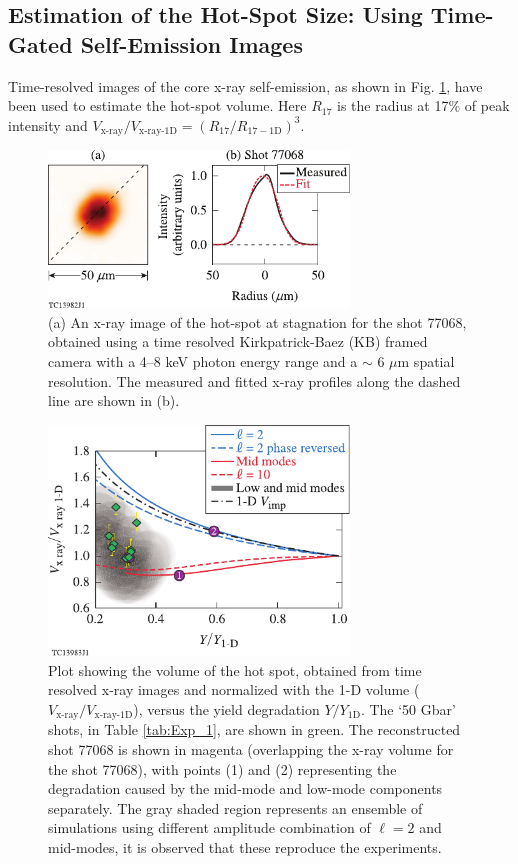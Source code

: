\documentclass[aip,reprint]{revtex4-1}
\begin{document}
\subsection{Estimation of the Hot-Spot Size: Using Time-Gated Self-Emission Images}
\label{sec:Exp_gatedimage}
%
%
 Time-resolved images of the core x-ray self-emission, as shown in Fig. \ref{fig:Exp_kbframed}, have been used to estimate the hot-spot volume. Here $R_{17}$ is the radius at 17$\%$ of peak intensity and $V_\text{x-ray}/V_\text{x-ray-1D} = (R_{17}/R_{17-\text{1D}})^3$.
%
%
\begin{figure}
\includegraphics[width=80mm]{Fig7_Bose}
\caption{\label{fig:Exp_kbframed} (a) An x-ray image of the hot-spot at stagnation for the shot 77068, obtained using a time resolved Kirkpatrick-Baez (KB) framed camera with a 4--8 keV photon energy range and a $\sim$ 6 $\mu$m spatial resolution.\cite{Exp_Fred} The measured and fitted x-ray profiles along the dashed line are shown in (b).}
\end{figure}
%
%
%
%
%
%
%
\begin{figure}
\includegraphics[width=80mm]{Fig8_Bose}
\caption{\label{fig:Exp_volume} Plot showing the volume of the hot spot, obtained from time resolved x-ray images and normalized with the 1-D volume ($V_\text{x-ray}/V_\text{x-ray-1D}$), versus the yield degradation $Y/Y_\text{1D}$. The `50 Gbar' shots, in Table \ref{tab:Exp_1}, are shown in green. The reconstructed shot 77068 is shown in magenta (overlapping the x-ray volume for the shot 77068), with points (1) and (2) representing the degradation caused by the mid-mode and low-mode components separately. The gray shaded region represents an ensemble of simulations using different amplitude combination of $\ell=2$ and mid-modes, it is observed that these reproduce the experiments.}
\end{figure}
%
%
%
\end{document}
